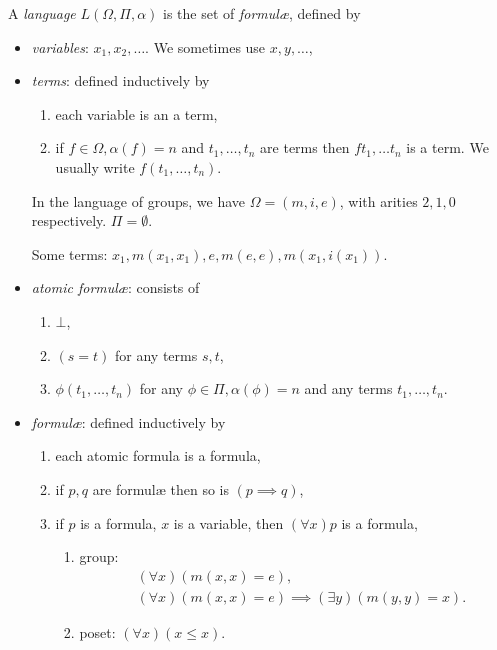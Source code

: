 \documentclass[a4paper]{article}
\begin{document}
\begin{definition}[Language]
  A \emph{language} \(L(\Omega, \Pi, \alpha)\) is the set of \emph{formulæ}, defined by
  \begin{itemize}
  \item \emph{variables}: \(x_1, x_2, \dots\). We sometimes use \(x, y, \dots\),
  \item \emph{terms}: defined inductively by
    \begin{enumerate}
    \item each variable is an a term,
    \item if \(f \in \Omega, \alpha(f) = n\) and \(t_1, \dots, t_n\) are terms then \(ft_1, \dots t_n\) is a term. We usually write \(f(t_1, \dots, t_n)\).
    \end{enumerate}
    \begin{eg}
      In the language of groups, we have \(\Omega = (m, i, e)\), with arities \(2, 1, 0\) respectively. \(\Pi = \emptyset\).

      Some terms: \(x_1, m(x_1, x_1), e, m(e, e), m(x_1, i(x_1))\).
    \end{eg}
  \item \emph{atomic formulæ}: consists of
    \begin{enumerate}
    \item \(\bot\),
    \item \((s = t)\) for any terms \(s, t\),
    \item \(\phi(t_1, \dots, t_n)\) for any \(\phi \in \Pi, \alpha(\phi) = n\) and any terms \(t_1, \dots, t_n\).
    \end{enumerate}
  \item \emph{formulæ}: defined inductively by
    \begin{enumerate}
    \item each atomic formula is a formula,
    \item if \(p, q\) are formulæ then so is \((p \implies q)\),
    \item if \(p\) is a formula, \(x\) is a variable, then \((\forall x) p\) is a formula,
      \begin{eg}\leavevmode
        \begin{enumerate}
        \item group:
          \begin{align*}
            & (\forall x) (m(x, x) = e), \\
            & (\forall x) (m(x, x) = e) \implies (\exists y)(m(y, y) = x).
          \end{align*}
        \item poset: \((\forall x) (x \leq x)\).
        \end{enumerate}
      \end{eg}
    \end{enumerate}
  \end{itemize}
\end{definition}
\end{document}
